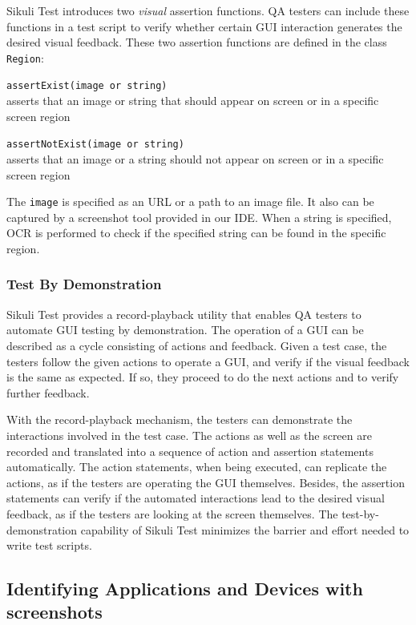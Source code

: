 \documentclass{chi2009}
\begin{document}
Sikuli Test introduces two \emph{visual} assertion functions. QA
testers can include these functions in a test script to verify
whether certain GUI interaction generates the
desired visual feedback. These two assertion functions are defined
in the class \verb|Region|:


\verb|assertExist(image or string)| \\
asserts that an
image or string that should appear on screen or in a specific screen region

\verb|assertNotExist(image or string)| \\
asserts that an
image or a string should not appear on screen or in a specific screen region

The \verb|image| is specified as an URL or a path to an image
file. It also can be captured by a screenshot tool provided in our IDE.
When a string is specified, OCR is performed to check if the
specified string can be found in the specific region. 

\subsubsection{Test By Demonstration}
Sikuli Test provides a record-playback utility that enables QA testers to
automate GUI testing by demonstration. The operation of a GUI can be described
as a cycle consisting of actions and feedback. Given a test case, the testers
follow the given actions to operate a GUI, and verify if the visual feedback is
the same as expected. If so, they proceed to do the next actions and to verify
further feedback.  


With the record-playback mechanism, the testers can demonstrate the
interactions involved in the test case. The actions as well as the
screen are recorded and translated into a sequence of action and assertion
statements automatically. The action statements, when being executed, can
replicate the actions, as if the testers are operating the GUI themselves.
Besides, the assertion statements can verify if the automated interactions
lead to the desired visual feedback, as if the testers are looking at the
screen themselves.  The test-by-demonstration capability of Sikuli Test 
minimizes the barrier and effort needed to write test scripts. 



\subsection{Identifying Applications and Devices with screenshots}
\end{document}
